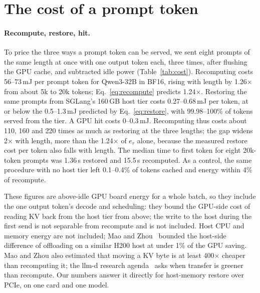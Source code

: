 \section{The cost of a prompt token}
\label{sec:cost}

\paragraph{Recompute, restore, hit.} To price the three ways a prompt token can be served, we sent eight prompts of
the same length at once with one output token each, three times, after flushing the GPU cache, and subtracted idle
power (Table~\ref{tab:cost}). Recomputing costs 56--73\,mJ per prompt token for Qwen3-32B in BF16, rising with length
by 1.26$\times$ from about 5k to 20k tokens; Eq.~\eqref{eq:recompute} predicts 1.24$\times$. Restoring the same
prompts from SGLang's 160\,GB host tier costs 0.27--0.68\,mJ per token, at or below the 0.5--1.3\,mJ predicted
by Eq.~\eqref{eq:restore}, with 99.98--100\% of tokens served from the tier. A GPU hit costs 0--0.3\,mJ. Recomputing
thus costs about 110, 160 and 220 times as much as restoring at the three lengths; the gap widens
2$\times$ with length, more than the 1.24$\times$ of $e_r$ alone, because the measured restore cost per token also falls with length. The median time to first token for eight 20k-token prompts was 1.36\,s restored and 15.5\,s
recomputed.
As a control, the same procedure with no host tier left 0.1--0.4\% of tokens cached and energy within 4\% of
recompute.

These figures are above-idle GPU board energy for a whole batch, so they include the one output token's decode and
scheduling: they bound the GPU-side cost of reading KV back from the host tier from above; the write to the host during the first send is not separable from recompute and is not included. Host CPU and memory energy are not included; Mao and
Zhou~\cite{mao2026offloading} bounded the host-side difference of offloading on a similar H200 host at under 1\% of the
GPU saving. Mao and Zhou also estimated that moving a KV byte is at least 400$\times$ cheaper than recomputing it; the
llm-d research agenda~\cite{sisodia2026toward} asks when transfer is greener than recompute. Our numbers answer it
directly for host-memory restore over PCIe, on one card and one model.

